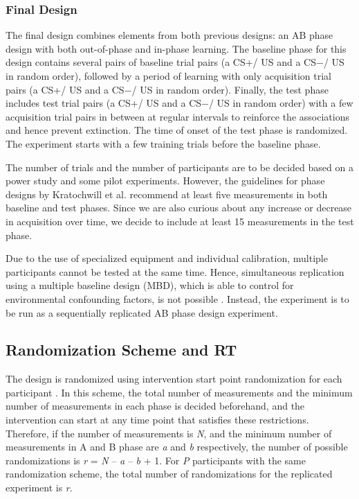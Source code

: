 \documentclass{jote-article}
\begin{document}
\subsubsection{Final Design}

The final design combines elements from both previous designs: an AB phase design with both out-of-phase and in-phase learning. The baseline phase for this design contains several pairs of baseline trial pairs (a CS+/ US and a CS−/ US in random order), followed by a period of learning with only acquisition trial pairs (a CS+/ US and a CS−/ US in random order). Finally, the test phase includes test trial pairs (a CS+/ US and a CS−/ US in random order) with a few acquisition trial pairs in between at regular intervals to reinforce the associations and hence prevent extinction. The time of onset of the test phase is randomized. The experiment starts with a few training trials before the baseline phase.

The number of trials and the number of participants are to be decided based on a power study and some pilot experiments. However, the guidelines for phase designs by Kratochwill et al. \cite{bibr26} recommend at least five measurements in both baseline and test phases. Since we are also curious about any increase or decrease in acquisition over time, we decide to include at least 15 measurements in the test phase.

Due to the use of specialized equipment and individual calibration, multiple participants cannot be tested at the same time. Hence, simultaneous replication using a multiple baseline design (MBD), which is able to control for environmental confounding factors, is not possible \cite{bibr9} \cite{bibr10}. Instead, the experiment is to be run as a sequentially replicated AB phase design experiment.

\subsection{Randomization Scheme and RT}

The design is randomized using intervention start point randomization for each participant \cite{bibr14}. In this scheme, the total number of measurements and the minimum number of measurements in each phase is decided beforehand, and the intervention can start at any time point that satisfies these restrictions. Therefore, if the number of measurements is \emph{N}, and the minimum number of measurements in A and B phase are \emph{a} and \emph{b} respectively, the number of possible randomizations is \emph{r} = \emph{N} – \emph{a} – \emph{b} + 1. For \emph{P} participants with the same randomization scheme, the total number of randomizations for the replicated experiment is \emph{r}.
\end{document}
